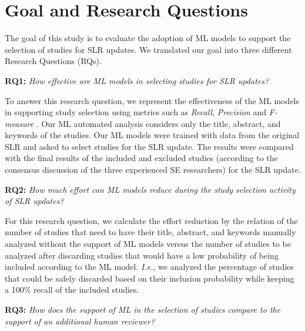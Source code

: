 \section{Goal and Research Questions}
\label{sec:researchissues}

The goal of this study is to evaluate the adoption of ML models to support the selection of studies for SLR updates. We translated our goal into three different Research Questions (RQs).

    \textbf{RQ1:} \textit{How effective are ML models in selecting studies for SLR updates?}

    To answer this research question, we represent the effectiveness of the ML models in supporting study selection using metrics such as \textit{Recall}, \textit{Precision} and \textit{F-measure} \cite{Napoleao2021, Watanabe20}. Our ML automated analysis considers only the title, abstract, and keywords of the studies. Our ML models were trained with data from the original SLR and asked to select studies for the SLR update. The results were compared with the final results of the included and excluded studies (according to the consensus discussion of the three experienced SE researchers) for the SLR update.
    

    \textbf{RQ2:} \textit{How much effort can ML models reduce during the study selection activity of SLR updates?}

    For this research question, we calculate the effort reduction by the relation of the number of studies that need to have their title, abstract, and keywords manually analyzed without the support of ML models versus the number of studies to be analyzed after discarding studies that would have a low probability of being included according to the ML model. \textit{I.e.}, we analyzed the percentage of studies that could be safely discarded based on their inclusion probability while keeping a 100\% recall of the included studies. 
   
    \textbf{RQ3:} \textit{How does the support of ML in the selection of studies compare to the support of an additional human reviewer?}

